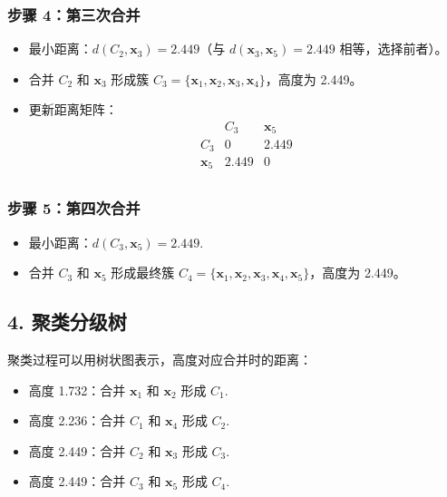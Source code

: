 \documentclass{article}
\begin{document}
\subsubsection*{步骤 4：第三次合并}
\begin{itemize}
    \item 最小距离：\( d(C_2, \mathbf{x}_3) = 2.449 \)（与 \( d(\mathbf{x}_3, \mathbf{x}_5) = 2.449 \) 相等，选择前者）。
    \item 合并 \( C_2 \) 和 \( \mathbf{x}_3 \) 形成簇 \( C_3 = \{ \mathbf{x}_1, \mathbf{x}_2, \mathbf{x}_3, \mathbf{x}_4 \} \)，高度为 2.449。
    \item 更新距离矩阵：
    \[
    \begin{array}{c|cc}
     & C_3 & \mathbf{x}_5 \\
    \hline
    C_3 & 0 & 2.449 \\
    \mathbf{x}_5 & 2.449 & 0 \\
    \end{array}
    \]
\end{itemize}

\subsubsection*{步骤 5：第四次合并}
\begin{itemize}
    \item 最小距离：\( d(C_3, \mathbf{x}_5) = 2.449 \).
    \item 合并 \( C_3 \) 和 \( \mathbf{x}_5 \) 形成最终簇 \( C_4 = \{ \mathbf{x}_1, \mathbf{x}_2, \mathbf{x}_3, \mathbf{x}_4, \mathbf{x}_5 \} \)，高度为 2.449。
\end{itemize}

\subsection*{4. 聚类分级树}
聚类过程可以用树状图表示，高度对应合并时的距离：
\begin{itemize}
    \item 高度 1.732：合并 \( \mathbf{x}_1 \) 和 \( \mathbf{x}_2 \) 形成 \( C_1 \).
    \item 高度 2.236：合并 \( C_1 \) 和 \( \mathbf{x}_4 \) 形成 \( C_2 \).
    \item 高度 2.449：合并 \( C_2 \) 和 \( \mathbf{x}_3 \) 形成 \( C_3 \).
    \item 高度 2.449：合并 \( C_3 \) 和 \( \mathbf{x}_5 \) 形成 \( C_4 \).
\end{itemize}
\end{document}
